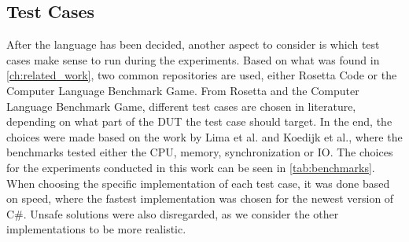 \subsection{Test Cases}

After the language has been decided, another aspect to consider is which test cases make sense to run during the experiments. Based on what was found in \cref{ch:related_work}, two common repositories are used, either Rosetta Code\cite[]{rosetta_code} or the Computer Language Benchmark Game\cite[]{benchmark_game}. From Rosetta and the Computer Language Benchmark Game, different test cases are chosen in literature, depending on what part of the DUT the test case should target. In the end, the choices were made based on the work by Lima et al.\cite[]{greenland2016statistical} and Koedijk et al.\cite[]{Koedijk2022diff}, where the benchmarks tested either the CPU, memory, synchronization or IO. The choices for the experiments conducted in this work can be seen in \cref{tab:benchmarks}. When choosing the specific implementation of each test case, it was done based on speed, where the fastest implementation was chosen for the newest version of C\#. Unsafe solutions were also disregarded, as we consider the other implementations to be more realistic.


